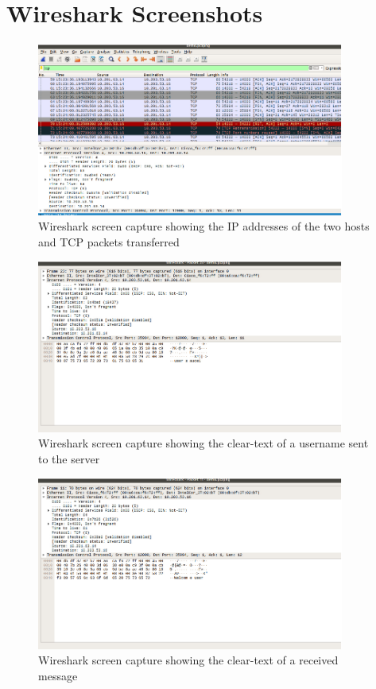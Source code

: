 \documentclass[journal, a4paper]{IEEEtran}
\begin{document}
\section{Wireshark Screenshots}
\label{appndx}
\begin{figure}[hbtp!]
	\centering
	\includegraphics[width = 0.9\textwidth]{wireshark2}
	\caption{Wireshark screen capture showing the IP addresses of the two hosts and TCP packets transferred}
	\label{wireshark1}
\end{figure}
\begin{figure}[hbtp!]
	\centering
	\includegraphics[width = 0.9\textwidth]{wireshark3}
	\caption{Wireshark screen capture showing the clear-text of a username sent to the server}
	\label{wireshark2}
\end{figure}
\begin{figure}[hbtp!]
	\centering
	\includegraphics[width = 0.9\textwidth]{wireshark1}
	\caption{Wireshark screen capture showing the clear-text of a received message}
	\label{wireshark3}
\end{figure}
\end{document}
